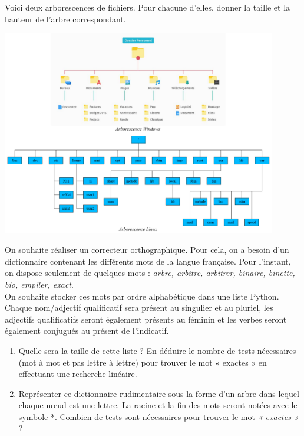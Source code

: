 \documentclass[a4paper,11pt]{article}
\begin{document}
\begin{exo}
    Voici deux arborescences de fichiers. Pour chacune d’elles, donner la taille et la hauteur de l’arbre correspondant.
    \begin{center}
        \centering
        \includegraphics[width=12cm]{ressources/os.png}
        \label{os}
    \end{center}
\end{exo}
\begin{exo}
    On souhaite réaliser un correcteur orthographique. Pour cela, on a besoin d’un dictionnaire contenant les différents mots
    de la langue française. Pour l’instant, on dispose seulement de quelques mots : \emph{arbre, arbitre, arbitrer, binaire, binette, bio, empiler, exact}.\\
    On souhaite stocker ces mots par ordre alphabétique dans une liste Python. Chaque nom/adjectif qualificatif sera
    présent au singulier et au pluriel, les adjectifs qualificatifs seront également présents au féminin et les verbes seront également conjugués au présent de l’indicatif.
    \begin{enumerate}
        \item  Quelle sera la taille de cette liste ? En déduire le nombre de tests nécessaires (mot à mot et pas lettre à lettre) pour trouver le mot « exactes » en effectuant une recherche linéaire.
        \item Représenter ce dictionnaire rudimentaire sous la forme d’un arbre dans lequel chaque nœud est une lettre. La racine et la fin des mots seront notées avec le symbole *. Combien de tests sont nécessaires pour trouver le mot \emph{« exactes »} ?
    \end{enumerate}
\end{exo}
\end{document}
